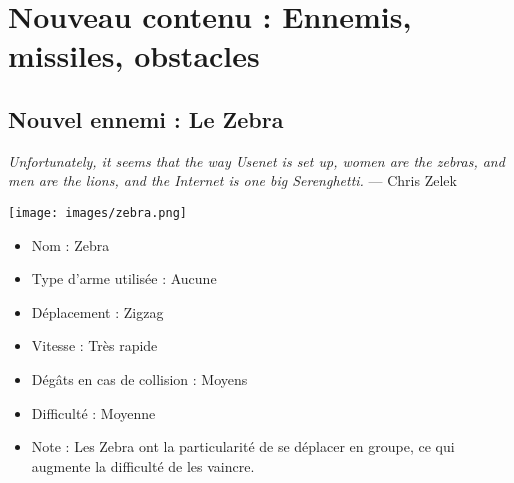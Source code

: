 \documentclass[12pt,a4paper]{article}
\begin{document}
	\newpage
\section{Nouveau contenu : Ennemis, missiles, obstacles}
\subsection{Nouvel ennemi : Le Zebra}
\par \emph{Unfortunately, it seems that the way Usenet is set up, women are the zebras, and men are the lions, and the Internet is one big Serenghetti.} ---  Chris Zelek
\vspace{0.8cm}
\begin{center}
\texttt{[image: images/zebra.png]}
\end{center}
\begin{itemize}
	\item Nom : Zebra
	\item Type d'arme utilisée : Aucune
	\item Déplacement : Zigzag
	\item Vitesse : Très rapide
	\item Dégâts en cas de collision : Moyens
	\item Difficulté : Moyenne
	\item Note : Les Zebra ont la particularité de se déplacer en groupe, ce qui augmente la difficulté de les vaincre.
\end{itemize}
\end{document}
